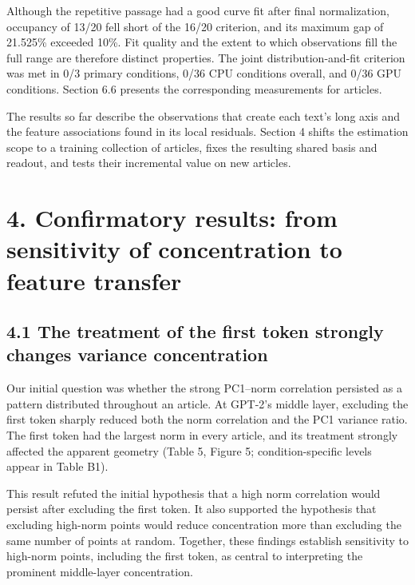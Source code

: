 Although the repetitive passage had a good curve fit after final normalization, occupancy of 13/20 fell short of the 16/20 criterion, and its maximum gap of 21.525\% exceeded 10\%. Fit quality and the extent to which observations fill the full range are therefore distinct properties. The joint distribution-and-fit criterion was met in 0/3 primary conditions, 0/36 CPU conditions overall, and 0/36 GPU conditions. Section 6.6 presents the corresponding measurements for articles.

The results so far describe the observations that create each text's long axis and the feature associations found in its local residuals. Section 4 shifts the estimation scope to a training collection of articles, fixes the resulting shared basis and readout, and tests their incremental value on new articles.

\FloatBarrier

\section{4. Confirmatory results: from sensitivity of concentration to feature transfer}\label{confirmatory-results-from-sensitivity-of-concentration-to-feature-transfer}

\FloatBarrier

\subsection{4.1 The treatment of the first token strongly changes variance concentration}\label{the-treatment-of-the-first-token-strongly-changes-variance-concentration}

Our initial question was whether the strong PC1--norm correlation persisted as a pattern distributed throughout an article. At GPT-2's middle layer, excluding the first token sharply reduced both the norm correlation and the PC1 variance ratio. The first token had the largest norm in every article, and its treatment strongly affected the apparent geometry (Table 5, Figure 5; condition-specific levels appear in Table B1).

This result refuted the initial hypothesis that a high norm correlation would persist after excluding the first token. It also supported the hypothesis that excluding high-norm points would reduce concentration more than excluding the same number of points at random. Together, these findings establish sensitivity to high-norm points, including the first token, as central to interpreting the prominent middle-layer concentration.

